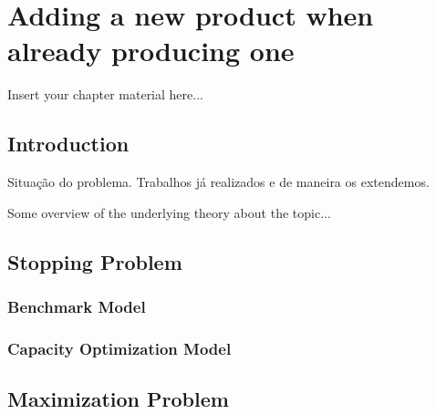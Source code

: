 
\chapter{Adding a new product when already producing one}
\label{chapter:2}

Insert your chapter material here...

\section{Introduction}
\label{section:2_intro}

Situação do problema.
Trabalhos já realizados e de maneira os extendemos.

Some overview of the underlying theory about the topic...


\section{Stopping Problem}
\label{section:2_theory}



\subsection{Benchmark Model}
\label{subsec:2_bm}

\subsection{Capacity Optimization Model}
\label{subsec:2_com}



\section{Maximization Problem}



